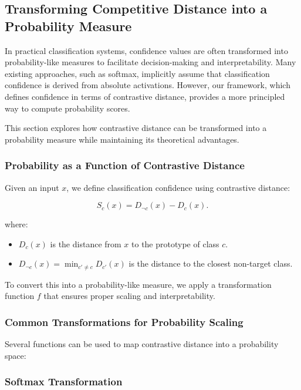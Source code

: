 \subsection{Transforming Competitive Distance into a Probability Measure}

In practical classification systems, confidence values are often transformed into probability-like measures to facilitate decision-making and interpretability. Many existing approaches, such as softmax, implicitly assume that classification confidence is derived from absolute activations. However, our framework, which defines confidence in terms of contrastive distance, provides a more principled way to compute probability scores.

This section explores how contrastive distance can be transformed into a probability measure while maintaining its theoretical advantages.

\subsubsection{Probability as a Function of Contrastive Distance}

Given an input \( x \), we define classification confidence using contrastive distance:

\[
S_c(x) = D_{\neg c}(x) - D_c(x).
\]

where:

\begin{itemize}
    \item \( D_c(x) \) is the distance from \( x \) to the prototype of class \( c \).
    \item \( D_{\neg c}(x) = \min_{c' \neq c} D_{c'}(x) \) is the distance to the closest non-target class.
\end{itemize}

To convert this into a probability-like measure, we apply a transformation function \( f \) that ensures proper scaling and interpretability.

\subsubsection{Common Transformations for Probability Scaling}

Several functions can be used to map contrastive distance into a probability space:

\subsubsection{Softmax Transformation}

